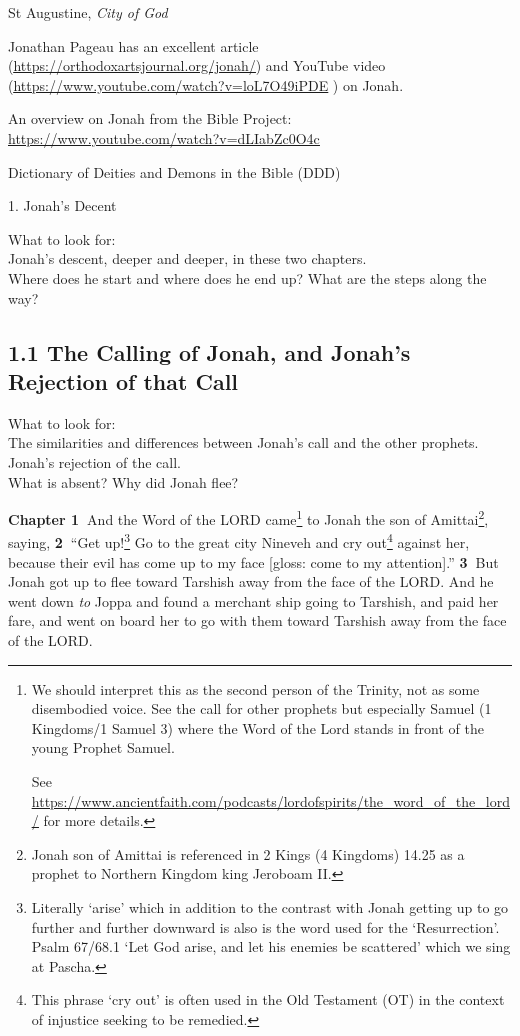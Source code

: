 \documentclass[
]{article}
\newcommand{\RL}[1]{\beginR #1\endR}
\begin{document}
St Augustine, \emph{City of God}

Jonathan Pageau has an excellent article
(\href{https://orthodoxartsjournal.org/jonah/}{\ul{https://orthodoxartsjournal.org/jonah/}})
and YouTube video
(\href{https://www.youtube.com/watch?v=loL7O49iPDE}{\ul{https://www.youtube.com/watch?v=loL7O49iPDE}}
) on Jonah.

An overview on Jonah from the Bible Project:\\
\href{https://www.youtube.com/watch?v=dLIabZc0O4c}{\ul{https://www.youtube.com/watch?v=dLIabZc0O4c}}

Dictionary of Deities and Demons in the Bible (DDD)

1. Jonah's Decent

What to look for:\\
Jonah's descent, deeper and deeper, in these two chapters.\\
Where does he start and where does he end up? What are the steps along
the way?

\subsection{1.1 The Calling of Jonah, and Jonah's Rejection of that
Call}\label{the-calling-of-jonah-and-jonahs-rejection-of-that-call}

What to look for:\\
The similarities and differences between Jonah's call and the other
prophets.\\
Jonah's rejection of the call.\\
What is absent? Why did Jonah flee?

\textbf{Chapter 1~}And the Word of the LORD came\footnote{We should
  interpret this as the second person of the Trinity, not as some
  disembodied voice. See the call for other prophets but especially
  Samuel (1 Kingdoms/1 Samuel 3) where the Word of the Lord stands in
  front of the young Prophet Samuel.

  See
  \href{https://www.ancientfaith.com/podcasts/lordofspirits/the_word_of_the_lord/}{\ul{https://www.ancientfaith.com/podcasts/lordofspirits/the\_word\_of\_the\_lord/}}
  for more details.} to Jonah the son of Amittai\footnote{Jonah son of
  Amittai is referenced in 2 Kings (4 Kingdoms) 14.25 as a prophet to
  Northern Kingdom king Jeroboam II.}, saying, \textbf{2~}\RL{``}Get
up!\footnote{Literally `arise' which in addition to the contrast with
  Jonah getting up to go further and further downward is also is the
  word used for the `Resurrection'. Psalm 67/68.1 `Let God arise, and
  let his enemies be scattered' which we sing at Pascha.} Go to the
great city Nineveh and cry out\footnote{This phrase `cry out' is often
  used in the Old Testament (OT) in the context of injustice seeking to
  be remedied.} against her, because their evil has come up to my face
{[}gloss: come to my attention{]}.'' \textbf{3~}But Jonah got up to flee
toward Tarshish away from the face of the LORD. And he went down
\emph{to} Joppa and found a merchant ship going to Tarshish, and paid
her fare, and went on board her to go with them toward Tarshish away
from the face of the LORD.
\end{document}
